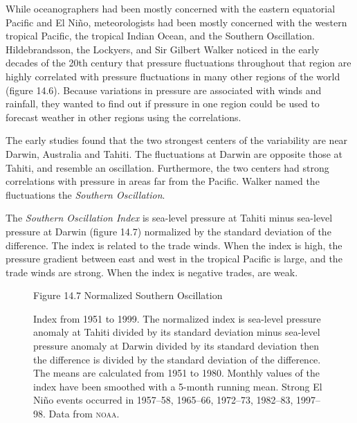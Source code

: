While oceanographers had been mostly concerned with the eastern
equatorial Pacific and El Ni\~{n}o, meteorologists had been mostly
concerned with the western tropical Pacific, the tropical Indian
Ocean, and the Southern Oscillation. Hildebrandsson, the Lockyers, and Sir Gilbert Walker
noticed in the early decades of the 20th century that pressure
fluctuations throughout that region are highly correlated with
pressure fluctuations in many other regions of the world (figure
14.6). Because variations in pressure are associated with winds and
rainfall, they wanted to find out if pressure in one region could be
used to forecast weather in other regions using the correlations.

The early studies found that the two strongest centers of the
variability are near Darwin, Australia and Tahiti. The fluctuations at
Darwin are opposite those at Tahiti, and resemble an
oscillation. Furthermore, the two centers had strong correlations with
pressure in areas far from the Pacific. Walker named the fluctuations
the \textit{Southern Oscillation}.

The \textit{Southern Oscillation Index} is sea-level pressure at Tahiti minus
sea-level pressure at Darwin (figure 14.7) normalized by the standard
deviation of the difference. The index is related to the trade
winds. When the index is high, the pressure gradient between east and
west in the tropical Pacific is large, and the trade winds are
strong. When the index is negative trades, are weak.

\begin{figure}[t!]
\footnotesize
Figure 14.7 Normalized Southern Oscillation \rule{0pt}{3ex}Index from
1951 to 1999. The normalized index is sea-level pressure anomaly at
Tahiti divided by its standard deviation minus sea-level pressure
anomaly at Darwin divided by its standard deviation then the
difference is divided by the standard deviation of the difference. The
means are calculated from 1951 to 1980. Monthly values of the index
have been smoothed with a 5-month running mean. Strong El Ni\~{n}o
events occurred in 1957--58, 1965--66, 1972--73, 1982--83,
1997--98. Data from \textsc{noaa}.
\label{fig:soi}
\vspace{-3ex}
\end{figure}

